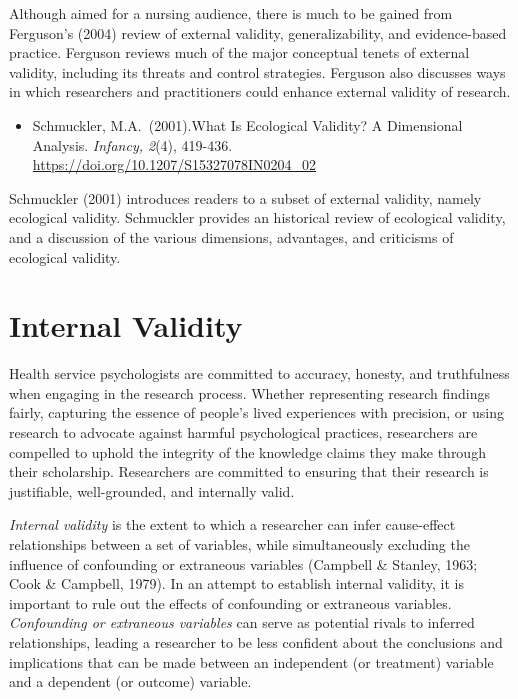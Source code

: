 \documentclass[
  11pt,
]{book}
\providecommand{\tightlist}{%
  \setlength{\itemsep}{0pt}\setlength{\parskip}{0pt}}
\begin{document}
Although aimed for a nursing audience, there is much to be gained from Ferguson's (2004) review of external validity, generalizability, and evidence-based practice. Ferguson reviews much of the major conceptual tenets of external validity, including its threats and control strategies. Ferguson also discusses ways in which researchers and practitioners could enhance external validity of research.

\begin{itemize}
\tightlist
\item
  Schmuckler, M.A.~(2001).What Is Ecological Validity? A Dimensional Analysis. \emph{Infancy, 2}(4), 419-436. \url{https://doi.org/10.1207/S15327078IN0204_02}
\end{itemize}

Schmuckler (2001) introduces readers to a subset of external validity, namely ecological validity. Schmuckler provides an historical review of ecological validity, and a discussion of the various dimensions, advantages, and criticisms of ecological validity.

\section{Internal Validity}\label{internal-validity}

Health service psychologists are committed to accuracy, honesty, and truthfulness when engaging in the research process. Whether representing research findings fairly, capturing the essence of people's lived experiences with precision, or using research to advocate against harmful psychological practices, researchers are compelled to uphold the integrity of the knowledge claims they make through their scholarship. Researchers are committed to ensuring that their research is justifiable, well-grounded, and internally valid.

\emph{Internal validity} is the extent to which a researcher can infer cause-effect relationships between a set of variables, while simultaneously excluding the influence of confounding or extraneous variables (Campbell \& Stanley, 1963; Cook \& Campbell, 1979). In an attempt to establish internal validity, it is important to rule out the effects of confounding or extraneous variables. \emph{Confounding or extraneous variables} can serve as potential rivals to inferred relationships, leading a researcher to be less confident about the conclusions and implications that can be made between an independent (or treatment) variable and a dependent (or outcome) variable.
\end{document}
